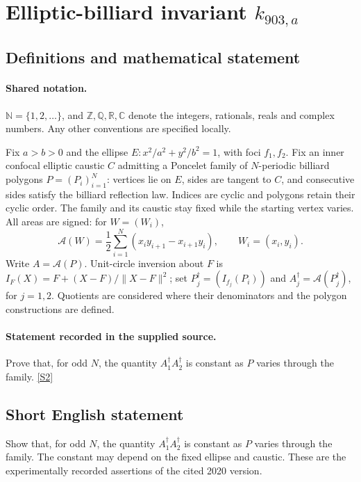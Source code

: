 \documentclass[11pt]{article}
\newcommand{\sref}[2]{\hyperlink{source:#1:#2}{[S#2]}}
\begin{document}
\section{Elliptic-billiard invariant $k_{903,a}$}\label{statement}

\subsection{Definitions and mathematical statement}

\paragraph{Shared notation.}$\mathbb N=\{1,2,\ldots\}$, and $\mathbb Z,\mathbb Q,\mathbb R,\mathbb C$ denote the integers, rationals, reals and complex numbers. Any other conventions are specified locally.


Fix $a>b>0$ and the ellipse $E:x^2/a^2+y^2/b^2=1$, with foci $f_1,f_2$. Fix an inner confocal elliptic caustic $C$ admitting a Poncelet family of $N$-periodic billiard polygons $P=(P_i)_{i=1}^N$: vertices lie on $E$, sides are tangent to $C$, and consecutive sides satisfy the billiard reflection law. Indices are cyclic and polygons retain their cyclic order. The family and its caustic stay fixed while the starting vertex varies. All areas are signed: for $W=(W_i)$,
\[\mathcal A(W)=\frac12\sum_{i=1}^N(x_i y_{i+1}-x_{i+1}y_i),\qquad W_i=(x_i,y_i).\]
Write $A=\mathcal A(P)$. Unit-circle inversion about $F$ is $I_F(X)=F+(X-F)/\lVert X-F\rVert^2$; set $P_j^\dagger=(I_{f_j}(P_i))$ and $A_j^\dagger=\mathcal A(P_j^\dagger)$, for $j=1,2$. Quotients are considered where their denominators and the polygon constructions are defined.
\paragraph{Statement recorded in the supplied source.}
Prove that, for odd $N$, the quantity $A_1^\dagger A_2^\dagger$ is constant as $P$ varies through the family. \sref{statement}{2}
\subsection{Short English statement}
Show that, for odd $N$, the quantity $A_1^\dagger A_2^\dagger$ is constant as $P$ varies through the family. The constant may depend on the fixed ellipse and caustic. These are the experimentally recorded assertions of the cited 2020 version.
\end{document}
